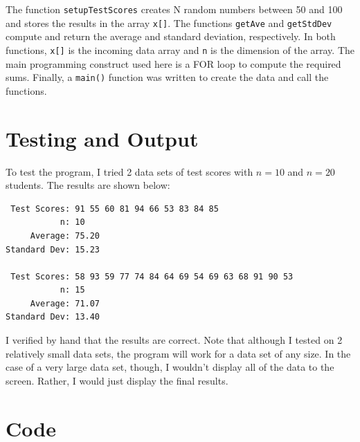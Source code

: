 \documentclass[12pt, letterpaper, final, onecolumn, titlepage] {article}
\begin{document}
The function \texttt{setupTestScores} creates N random numbers between 50 and 100 and stores the results in the array \texttt{x[]}. The functions \texttt{getAve} and \texttt{getStdDev} compute and return the average and standard deviation, respectively. In both functions, \texttt{x[]} is the incoming data array and \texttt{n} is the dimension of the array. The main programming construct used here is a FOR loop to compute the required sums. Finally, a \texttt{main()} function was written to create the data and call the functions.

\section{Testing and Output}

To test the program, I tried 2 data sets of test scores with \(n = 10\) and \(n = 20\) students. The results are shown below:

\singlespacing
\begin{lstlisting}
 Test Scores: 91 55 60 81 94 66 53 83 84 85 
           n: 10
     Average: 75.20
Standard Dev: 15.23

 Test Scores: 58 93 59 77 74 84 64 69 54 69 63 68 91 90 53
           n: 15
     Average: 71.07
Standard Dev: 13.40
\end{lstlisting}
\doublespacing

I verified by hand that the results are correct. Note that although I tested on 2 relatively small data sets, the program will work for a data set of any size. In the case of a very large data set, though, I wouldn’t display all of the data to the screen. Rather, I would just display the final results.

\pagebreak

\section{Code}
\singlespacing
\end{document}
